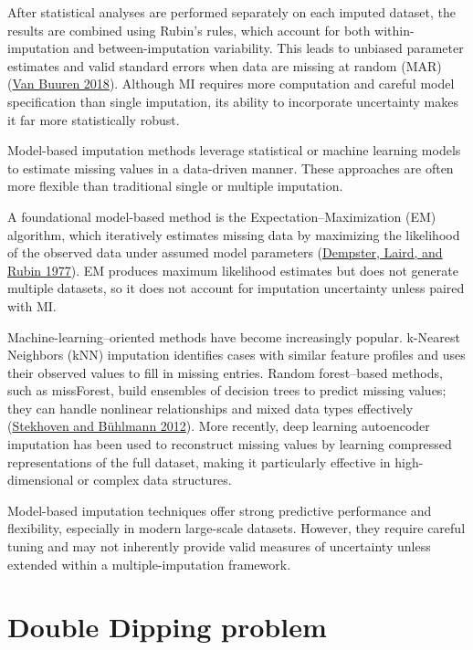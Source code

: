\documentclass[
  12pt,
]{article}
\begin{document}
After statistical analyses are performed separately on each imputed
dataset, the results are combined using Rubin's rules, which account for
both within-imputation and between-imputation variability. This leads to
unbiased parameter estimates and valid standard errors when data are
missing at random (MAR) 
(\protect\hyperlink{ref-vanBuuren2018}{Van Buuren 2018}). Although MI requires more
computation and careful model specification than single imputation, its
ability to incorporate uncertainty makes it far more statistically
robust.

Model-based imputation methods leverage statistical or machine learning
models to estimate missing values in a data-driven manner. These
approaches are often more flexible than traditional single or multiple
imputation.

A foundational model-based method is the Expectation--Maximization (EM)
algorithm, which iteratively estimates missing data by maximizing the
likelihood of the observed data under assumed model parameters
(\protect\hyperlink{ref-dempster1977maximum}{Dempster, Laird, and Rubin
1977}). EM produces maximum likelihood estimates but does not generate
multiple datasets, so it does not account for imputation uncertainty
unless paired with MI.

Machine-learning--oriented methods have become increasingly popular.
k-Nearest Neighbors (kNN) imputation identifies cases with similar
feature profiles and uses their observed values to fill in missing
entries. Random forest--based methods, such as missForest, build
ensembles of decision trees to predict missing values; they can handle
nonlinear relationships and mixed data types effectively
(\protect\hyperlink{ref-Stekhoven2012}{Stekhoven and Bühlmann 2012}).
More recently, deep learning autoencoder imputation has been used to
reconstruct missing values by learning compressed representations of the
full dataset, making it particularly effective in high-dimensional or
complex data structures.

Model-based imputation techniques offer strong predictive performance
and flexibility, especially in modern large-scale datasets. However,
they require careful tuning and may not inherently provide valid
measures of uncertainty unless extended within a multiple-imputation
framework.

\section{Double Dipping problem}
\end{document}

